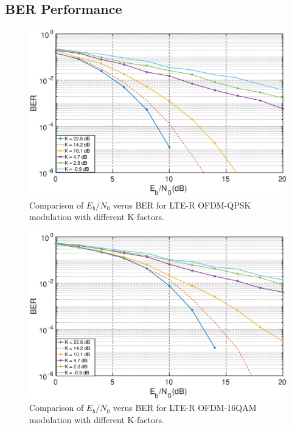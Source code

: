 \subsection{BER Performance}

\begin{figure}[!ht]
\label{qpsk}
\centering
\includegraphics[width=\linewidth,keepaspectratio]{images/Gill/lte_figs/qpskricean.eps} 
\caption{Comparison of $E_b/N_0$ verus BER for LTE-R OFDM-QPSK modulation with different K-factors.}
\end{figure}

\begin{figure}[!ht]
\label{16qam}
\centering
\includegraphics[width=\linewidth,keepaspectratio]{images/Gill/lte_figs/16qamricean.eps} 
\caption{Comparison of $E_b/N_0$ verus BER for LTE-R OFDM-16QAM modulation with different K-factors.}
\end{figure}

